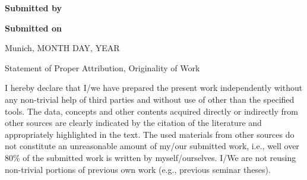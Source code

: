 \vspace*{4.3mm}
\textbf{Submitted by}\tab
\begin{minipage}[t]{\textwidth-\CurrentLineWidth}
\EingereichtVon
\end{minipage}

\vspace*{-1mm}
\textbf{Submitted on}\tab 
\begin{minipage}[t]{\textwidth-\CurrentLineWidth}
Munich, MONTH DAY, YEAR \Date\strut
\end{minipage}

\newpage

\vspace*{-15.8mm}
\fontsize{19pt}{21pt}\selectfont
\ErklaerungUeberschrift

\vspace{25.3mm}
Statement of Proper Attribution, Originality of Work

\normalsize\selectfont
\vspace{13.2mm}
I hereby declare that I/we have prepared the present work independently without any non-trivial help of third parties and without use of other than the specified tools. The data, concepts and other contents acquired directly or indirectly from other sources are clearly indicated by the citation of the literature and appropriately highlighted in the text. The used materials from other sources do not constitute an unreasonable amount of my/our submitted work, i.e., well over 80\% of the submitted work is written by myself/ourselves. I/We are not reusing non-trivial portions of previous own work (e.g., previous seminar theses). 


